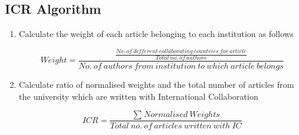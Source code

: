 \documentclass{article}
\begin{document}
\subsection{ICR Algorithm}
\begin{enumerate}
        \item Calculate the weight of each article belonging to each institution as follows
        
              \begin{center}
         \begin{equation*}
Weight = \frac{\frac{No.\ of\ different\ collaborating\ countries\ for\ article}{Total\ no.\ of\ authors}}{ No.\ of\ authors\ from\ institution\ to\ which\ article\ belongs}
\end{equation*}
    \end{center}
    \vspace{1em}
\item Calculate ratio of normalised weights and the total number of articles from the university which are written with International Collaboration 
\begin{center}
         \begin{equation*}
ICR = \frac{\sum^{}Normalised\ Weights}{Total\ no.\ of\ articles\ written\ with\ IC}
\end{equation*}
    \end{center}
\end{enumerate}
       
\end{document}
